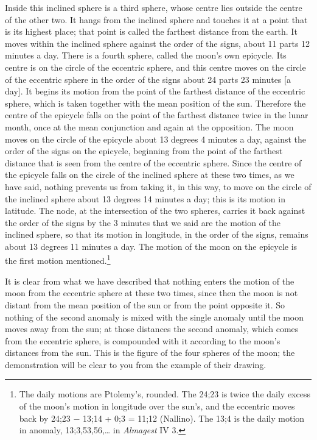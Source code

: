 \documentclass[11pt]{article}
\newcommand{\ArPage}[1]{\marginpar{\footnotesize\color{gray}Ar.\,p.\,#1}}
\begin{document}
\par \ArPage{77}Inside this inclined sphere is a third sphere, whose centre lies outside the centre of the other two. It hangs from the inclined sphere and touches it at a point that is its highest place; that point is called the farthest distance from the earth. It moves within the inclined sphere against the order of the signs, about 11 parts 12 minutes a day. There is a fourth sphere, called the moon's own epicycle. Its centre is on the circle of the eccentric sphere, and this centre moves on the circle of the eccentric sphere in the order of the signs about 24 parts 23 minutes [a day]. It begins its motion from the point of the farthest distance of the eccentric sphere, which is taken together with the mean position of the sun. Therefore the centre of the epicycle falls on the point of the farthest distance twice in the lunar month, once at the mean conjunction and again at the opposition. The moon moves on the circle of the epicycle about 13 degrees 4 minutes a day, against the order of the signs on the epicycle, beginning from the point of the farthest distance that is seen from the centre of the eccentric sphere. Since the centre of the epicycle falls on the circle of the inclined sphere at these two times, as we have said, nothing prevents us from taking it, in this way, to move on the circle of the inclined sphere about 13 degrees 14 minutes a day; this is its motion in latitude. The node, at the intersection of the two spheres, carries it back against the order of the signs by the 3 minutes that we said are the motion of the inclined sphere, so that its motion in longitude, in the order of the signs, remains about 13 degrees 11 minutes a day. The motion of the moon on the epicycle is the first motion mentioned.\footnote{The daily motions are Ptolemy's, rounded. The 24;23 is twice the daily excess of the moon's motion in longitude over the sun's, and the eccentric moves back by 24;23 − 13;14 + 0;3 = 11;12 (Nallino). The 13;4 is the daily motion in anomaly, 13;3,53,56,… in \emph{Almagest} IV 3.}\par
\par It is clear from what we have described that nothing enters the motion of the moon from the eccentric sphere at these two times, since then the moon is not distant from the mean position of the sun or from the point opposite it. So nothing of the second anomaly is mixed with the single anomaly until the moon moves away from the sun; at those distances the second anomaly, which comes from the eccentric sphere, is compounded with it according to the moon's distances from the sun. This is the figure of the four spheres of the moon; the demonstration will be clear to you from the example of their drawing.\par
\end{document}
